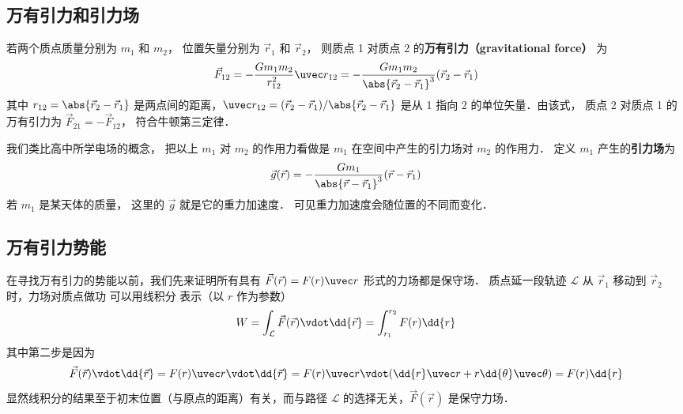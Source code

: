

\subsection{万有引力和引力场}

若两个质点质量分别为 $m_1$ 和 $m_2$， 位置矢量分别为 $\vec r_1$ 和 $\vec r_2$， 则质点 1 对质点 2 的\textbf{万有引力（gravitational force）} 为
\begin{equation}\label{Gravty_eq1}
\vec F_{12} =  - \frac{G m_1 m_2}{r_{12}^2} \uvec r_{12} = - \frac{G m_1 m_2}{\abs{\vec r_2 - \vec r_1}^3}(\vec r_2 - \vec r_1)
\end{equation}
其中 $r_{12} = \abs{\vec r_2 - \vec r_1}$ 是两点间的距离，$\uvec r_{12} = (\vec r_2 - \vec r_1)/\abs{\vec r_2 - \vec r_1}$ 是从 1 指向 2 的单位矢量．由该式， 质点 2 对质点 1 的万有引力为 $\vec F_{21} = -\vec F_{12}$， 符合牛顿第三定律．

我们类比高中所学电场的概念， 把以上 $m_1$ 对 $m_2$ 的作用力看做是 $m_1$ 在空间中产生的引力场对 $m_2$ 的作用力． 定义 $m_1$ 产生的\textbf{引力场}为
\begin{equation}\label{Gravty_eq2}
\vec g(\vec r) = -\frac{Gm_1}{\abs{\vec r - \vec r_1} ^3}(\vec r - \vec r_1)
\end{equation}
若 $m_1$ 是某天体的质量， 这里的 $\vec g$ 就是它的重力加速度． 可见重力加速度会随位置的不同而变化．

\subsection{万有引力势能}
在寻找万有引力的势能以前，我们先来证明所有具有 $\vec F(\vec r) = F(r) \uvec r$ 形式的力场都是保守场． 质点延一段轨迹 $\mathcal{L}$ 从 $\vec r_1$ 移动到 $\vec r_2$ 时，力场对质点做功 可以用线积分 表示（以 $r$ 作为参数）
\begin{equation}
W = \int_\mathcal{L} \vec F(\vec r) \vdot \dd{\vec r} = \int_{r_1}^{r_2} F(r) \dd{r}
\end{equation}
其中第二步是因为
\begin{equation}
\vec F(\vec r) \vdot \dd{\vec r} = F(r)\uvec r \vdot \dd{\vec r} = F(r)\uvec  r \vdot (\dd{r} \uvec  r + r\dd{\theta} \uvec \theta ) = F(r) \dd{r}
\end{equation}
显然线积分的结果至于初末位置（与原点的距离）有关，而与路径 $\mathcal{L}$ 的选择无关，$\vec F(\vec r)$ 是保守力场．


